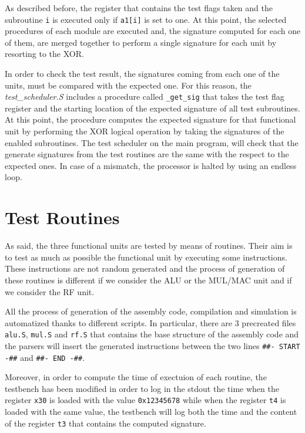 \documentclass[paper=a4, fontsize=10pt]{scrartcl}	%
\begin{document}
	As described before, the register that contains the test flags taken and the subroutine \texttt{i} is executed only if \texttt{a1[i]} is set to one. At this point, the selected procedures of each module are executed and, the signature computed for each one of them, are merged together to perform a single signature for each unit by resorting to the XOR. 
	
	In order to check the test result, the signatures coming from each one of the units, must be compared with the expected one. For this reason, the \textit{test\_scheduler.S} includes a procedure called \texttt{\_get\_sig} that takes the test flag register and the starting location of the expected signature of all test subroutines. At this point, the procedure computes the expected signature for that functional unit by performing the XOR logical operation by taking the signatures of the enabled subroutines. The test scheduler on the main program, will check that the generate signatures from the test routines are the same with the respect to the expected ones. In case of a mismatch, the processor is halted by using an endless loop.

	\section{Test Routines}
	As said, the three functional units are tested by means of routines. Their aim is to test as much as possible the functional unit by executing some instructions. These instructions are not random generated and the process of generation of these routines is different if we consider the ALU or the MUL/MAC unit and if we consider the RF unit. \newline

	All the process of generation of the assembly code, compilation and simulation is automatized thanks to different scripts. In particular, there are 3 precreated files \texttt{alu.S}, \texttt{mul.S} and \texttt{rf.S} that contains the base structure of the assembly code and the parsers will insert the generated instructions between the two lines \texttt{\#\#- START -\#\#} and \texttt{\#\#- END -\#\#}.\newline

	Moreover, in order to compute the time of exectuion of each routine, the testbench has been modified in order to log in the stdout the time when the register \texttt{x30} is loaded with the value \texttt{0x12345678} while when the register \texttt{t4} is loaded with the same value, the testbench will log both the time and the content of the register \texttt{t3} that contains the computed signature.
\end{document}
